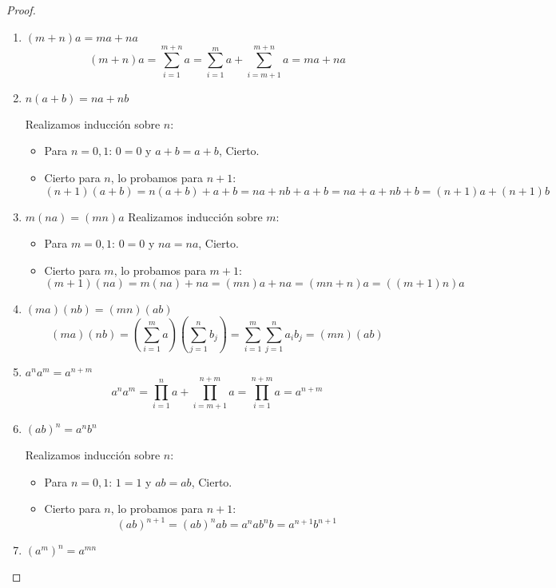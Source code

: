 \begin{proof} \
    \begin{enumerate}
        \item $(m+n)a = ma + na$
        $$(m+n)a = \sum_{i=1}^{m+n} a = \sum_{i=1}^m a + \sum_{i=m+1}^{m+n} a = ma + na$$

        \item $n(a+b) = na+nb$
        
        Realizamos inducción sobre $n$:
        \begin{itemize}
            \item Para $n=0,1$: $0=0$ y $a+b = a+b$, Cierto.
            \item Cierto para $n$, lo probamos para $n+1$:
            $$(n+1)(a+b)=n(a+b)+a+b = na + nb +a+b=na+a+nb+b = (n+1)a+(n+1)b$$
        \end{itemize}

        \item $m(na) = (mn)a$
        Realizamos inducción sobre $m$:
        \begin{itemize}
            \item Para $m=0,1$: $0=0$ y $na = na$, Cierto.
            \item  Cierto para $m$, lo probamos para $m+1$:
            $$(m+1)(na) = m(na) + na = (mn)a + na = (mn+n)a = ((m+1)n)a$$
        \end{itemize}

        \item $(ma)(nb) = (mn)(ab)$
        $$(ma)(nb) = \left(\sum_{i=1}^m a\right) \left(\sum_{j=1}^n b_j\right) = \sum_{i=1}^m \sum_{j=1}^n a_ib_j = (mn)(ab)$$

        \item $a^na^m = a^{n+m}$
        $$a^na^m =  \prod_{i=1}^n a + \prod_{i=m+1}^{n+m} a = \prod_{i=1}^{n+m} a =a^{n+m}$$

        \item $(ab)^n = a^nb^n$
        
        Realizamos inducción sobre $n$:
        \begin{itemize}
            \item Para $n=0,1$: $1=1$ y $ab = ab$, Cierto.
            \item Cierto para $n$, lo probamos para $n+1$:
            $$(ab)^{n+1} = (ab)^n ab = a^nab^nb = a^{n+1}b^{n+1}$$
        \end{itemize}

        \item $(a^m)^n = a^{mn}$
        

\end{enumerate}
\end{proof}
